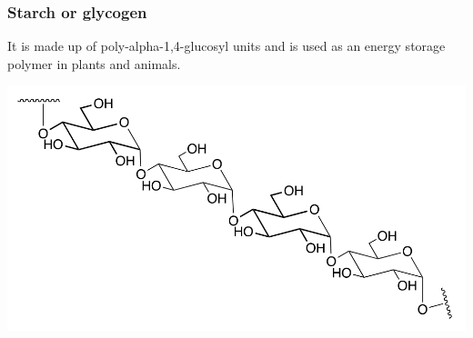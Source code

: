 \documentclass[11pt]{article}
\begin{document}
\newpage
\subsubsection{Starch or glycogen}
\label{sec:orgcda51e8}
It is made up of poly-alpha-1,4-glucosyl units and is used as an energy storage polymer in plants and animals.
\begin{center}
\includegraphics[width=.9\linewidth]{./images/starch.png}
\end{center}
\end{document}
